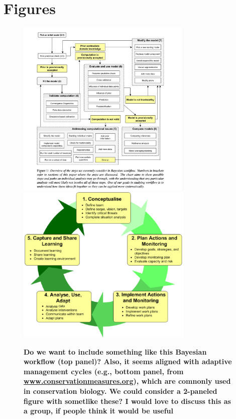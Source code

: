 \documentclass{article}
\begin{document}
\section* {Figures}
 \begin{figure}[h]
\centering
 \includegraphics[width=0.75\textwidth]{../figs/BayesianWorkflowfromGelman2020.jpg}
  \includegraphics[width=0.75\textwidth]{../figs/The-Open-Standards-adaptive-management-cycle-from-wwwconservationmeasuresorg.png}
 \caption{\textbf{Do we want to include something like this Bayesian workflow \citep{gelman2020bayesian} (top panel)? Also, it seems aligned with adaptive management cycles (e.g., bottom panel, from \href{www.conservationmeasures.org}{www.conservationmeasures.org}), which are comnonly used in conservation biology. We could consider a 2-paneled figure with sometlike these? I would love to discuss this as a group, if people think it would be useful}} 
 \label{fig:workflow}
 \end{figure}
\end{document}
